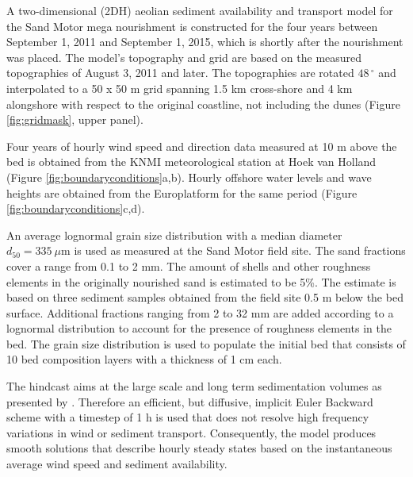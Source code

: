 A two-dimensional (2DH) aeolian sediment availability and transport
model for the Sand Motor mega nourishment is constructed for the four
years between September 1, 2011 and September 1, 2015, which is
shortly after the nourishment was placed. The model's topography and
grid are based on the measured topographies of August 3, 2011 and
later. The topographies are rotated $48\,^{\circ}$ and interpolated to
a 50 x 50 m grid spanning 1.5 km cross-shore and 4 km alongshore with
respect to the original coastline, not including the dunes (Figure
\ref{fig:gridmask}, upper panel).

Four years of hourly wind speed and direction data measured at 10 m
above the bed is obtained from the KNMI meteorological station at Hoek
van Holland (Figure \ref{fig:boundaryconditions}a,b). Hourly offshore
water levels and wave heights are obtained from the Europlatform for
the same period (Figure \ref{fig:boundaryconditions}c,d).

An average lognormal grain size distribution with a median diameter
$d_{50} = 335 ~ \mu \mathrm{m}$ is used as measured at the Sand Motor
field site. The sand fractions cover a range from 0.1 to 2 mm. The
amount of shells and other roughness elements in the originally
nourished sand is estimated to be 5\%. The estimate is based on three
sediment samples obtained from the field site 0.5 m below the bed
surface. Additional fractions ranging from 2 to 32 mm are added
according to a lognormal distribution to account for the presence of
roughness elements in the bed. The grain size distribution is used to
populate the initial bed that consists of 10 bed composition layers
with a thickness of 1 cm each.

The hindcast aims at the large scale and long term sedimentation
volumes as presented by \citet{Hoonhout2016a}. Therefore an efficient,
but diffusive, implicit Euler Backward scheme with a timestep of 1 h
is used that does not resolve high frequency variations in wind or
sediment transport. Consequently, the model produces smooth solutions
that describe hourly steady states based on the instantaneous average
wind speed and sediment availability.


